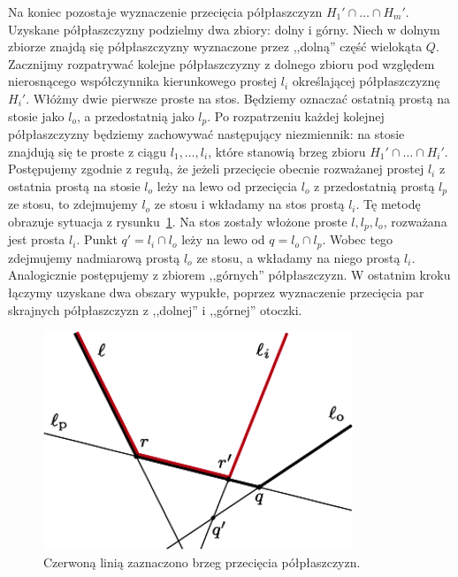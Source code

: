 Na koniec pozostaje wyznaczenie przecięcia półpłaszczyzn $H_1' \cap
\ldots \cap H_m'$. Uzyskane półpłaszczyzny podzielmy dwa zbiory: dolny
i górny. Niech w dolnym zbiorze znajdą się półpłaszczyzny wyznaczone
przez ,,dolną'' część wielokąta $Q$. Zacznijmy rozpatrywać kolejne
półpłaszczyzny z dolnego zbioru pod względem nierosnącego
współczynnika kierunkowego prostej $l_i$ określającej półpłaszczyznę
$H_i'$. Włóżmy dwie pierwsze proste na stos. Będziemy oznaczać
ostatnią prostą na stosie jako $l_o$, a przedostatnią jako $l_p$. Po
rozpatrzeniu każdej kolejnej półpłaszczyzny będziemy zachowywać
następujący niezmiennik: na stosie znajdują się te proste z ciągu
$l_1, \ldots, l_i$, które stanowią brzeg zbioru $H_1' \cap \ldots \cap
H_i'$. Postępujemy zgodnie z regułą, że jeżeli przecięcie obecnie
rozważanej prostej $l_i$ z ostatnia prostą na stosie $l_o$ leży na
lewo od przecięcia $l_o$ z przedostatnią prostą $l_p$ ze stosu, to
zdejmujemy $l_o$ ze stosu i wkładamy na stos prostą $l_i$. Tę metodę
obrazuje sytuacja z rysunku~\ref{img:containment2}. Na stos zostały
włożone proste $l, l_p, l_o$, rozważana jest prosta $l_i$. Punkt $q' =
l_i \cap l_o$ leży na lewo od $q = l_o \cap l_p$. Wobec tego
zdejmujemy nadmiarową prostą $l_o$ ze stosu, a wkładamy na niego
prostą $l_i$. Analogicznie postępujemy z zbiorem ,,górnych''
półpłaszczyzn. W ostatnim kroku łączymy uzyskane dwa obszary wypukłe,
poprzez wyznaczenie przecięcia par skrajnych półpłaszczyzn z
,,dolnej'' i ,,górnej'' otoczki.

\vspace{4cm}

\begin{figure}[ht]
  \centering
  \includegraphics[scale=0.6]{img/containment2}
  \caption{\label{img:containment2} Czerwoną linią zaznaczono brzeg
    przecięcia półpłaszczyzn.}
\end{figure}

\cleardoublepage{}

